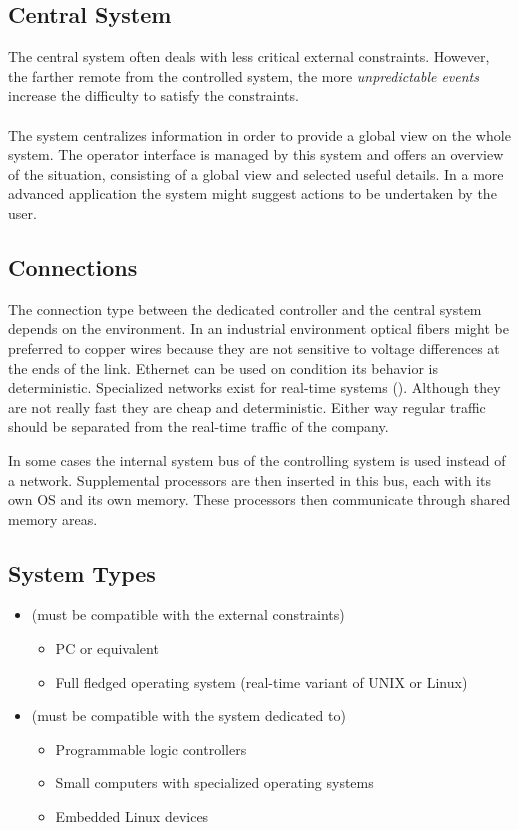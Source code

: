 \documentclass[../main.tex]{subfiles}
\begin{document}
\subsection{Central System}
The central system often deals with less critical external constraints. However, the farther remote from the controlled system, the more \textit{unpredictable events} increase the difficulty to satisfy the constraints. 
\\\\
The system centralizes information in order to provide a global view on the whole system. The operator interface is managed by this system and offers an overview of the situation, consisting of a global view and selected useful details. In a more advanced application the system might suggest actions to be undertaken by the user.

\subsection{Connections}
The connection type between the dedicated controller and the central system depends on the environment.
In an industrial environment optical fibers might be preferred to copper wires because they are not sensitive to voltage differences at the ends of the link.
Ethernet can be used on condition its behavior is deterministic.
Specialized networks exist for real-time systems ().
Although they are not really fast they are cheap and deterministic. Either way regular traffic should be separated from the  real-time traffic of the company. 

In some cases the internal system bus of the controlling system is used instead of a network. Supplemental processors are then inserted in this bus, each with its own OS and its own memory. These processors then communicate through shared memory areas.

\subsection{System Types}
\begin{itemize}
	\item {} (must be compatible with the external constraints)
	\begin{itemize}
		\item PC or equivalent
		\item Full fledged operating system (real-time variant of UNIX or Linux)
	\end{itemize}
	\item {} (must be compatible with the system dedicated to)
	\begin{itemize}
		\item Programmable logic controllers
		\item Small computers with specialized operating systems
		\item Embedded Linux devices
	\end{itemize}
\end{itemize}
\end{document}
